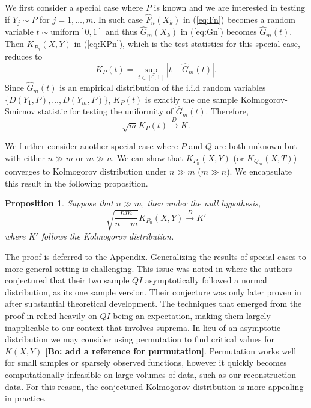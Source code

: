 \documentclass[12pt]{article}
\newtheorem{proposition}{Proposition}[section]
\newcommand{\bl}[1]{\color{Red}\textbf{[Bo: #1]}\normalcolor}
\begin{document}

We first consider a special case where $P$ is known and we are interested in testing if  $Y_j\sim P$ for $j=1,\ldots, m$. In such case $\widehat{F}_n(X_k)$ in (\ref{eq:Fn}) becomes a random variable $t\sim$uniform$[0, 1]$ and thus $\widehat{G}_m(X_k)$ in (\ref{eq:Gn}) becomes $\widehat{G}_m(t)$. Then $K_{P_n}(X, Y)$ in (\ref{eq:KPn}), which is the test statistics for this special case,  reduces to 
\[
K_{P}(t) = \sup_{t \in [0, 1]}|t - \widehat{G}_m(t)|. 
\]
Since $\widehat{G}_m(t)$ is an empirical distribution of the i.i.d random variables $\{D(Y_1, P), \dots, D(Y_m, P) \}$, $K_{P}(t)$ is exactly the one sample Kolmogorov-Smirnov statistic for testing the uniformity of $\widehat{G}_m(t)$. Therefore,
\[
\sqrt{m} K_P(t) \xrightarrow{D} K.
\]


We further consider another special case where $P$ and $Q$ are both unknown but with either $n \gg m$ or $m \gg n$. We can show that $K_{P_n}(X, Y)$ (or $K_{Q_m} (X, T)$) converges to Kolmogorov distribution under $n \gg m$ ($m \gg n$).  
We encapsulate this result in the following proposition.
\begin{proposition} \label{asymptotic}
Suppose that $n \gg m$, then under the null hypothesis,
\[
\sqrt{\frac{nm}{n+m}} K_{P_n}(X, Y) \xrightarrow{D} K'
\]
where $K'$ follows the Kolmogorov distribution.
\end{proposition}
The proof is deferred to the Appendix. 
Generalizing the results of special cases to more general setting is challenging. This issue was noted in \citet{quality} where the authors conjectured that their two sample $QI$ asymptotically followed a normal distribution, as its one sample version. Their conjecture was only later proven in \citet{xuming} after substantial theoretical development. The techniques that emerged from the proof in \citet{xuming} relied heavily on $QI$ being an expectation, making them largely inapplicable to our context that involves suprema.
In lieu of an asymptotic distribution we may consider using permutation to find critical values for $K(X, Y)$ \bl{add a reference for purmutation}. Permutation works well for small samples or sparsely observed functions, however it quickly becomes computationally infeasible on large volumes of data, such as our reconstruction data. For this reason, the conjectured Kolmogorov distribution is more appealing in practice. 
\end{document}
